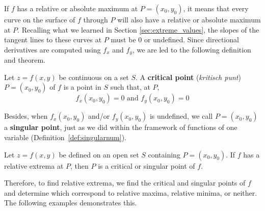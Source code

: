 If $f$ has a relative or absolute maximum at $P=(x_0,y_0)$, it means that every curve on the surface of $f$ through $P$ will also have a relative or absolute maximum at $P$. Recalling what we learned in Section \ref{sec:extreme_values}, the slopes of the tangent lines to these curves at $P$ must be 0 or undefined. Since directional derivatives are computed using $f_x$ and $f_y$, we are led to the following definition and theorem.

\begin{definition}\label{def:multi_critical_point}
Let $z = f(x,y)$ be continuous on a set $S$. A \textbf{critical point} (\textit{kritisch punt}) $P=(x_0,y_0)$ of $f$ is a point in $S$ such that, at $P$,
$$
f_x(x_0,y_0) = 0 \text{ and } f_y(x_0,y_0) = 0
$$
\end{definition}

Besides, when $f_x(x_0,y_0)$ and/or $f_y(x_0,y_0)$ is undefined, we call $P=(x_0,y_0)$ a \textbf{singular point}, just as we did within the framework of functions of one variable (Definition~\ref{def:singularnum}). 

\begin{theorem}\label{thm:multi_critical_point}
Let $z=f(x,y)$ be defined on an open set $S$ containing $P=(x_0,y_0)$. If $f$ has a relative extrema at $P$, then $P$ is a critical or singular point of $f$.
\end{theorem}

Therefore, to find relative extrema, we find the critical and singular points of $f$ and determine which correspond to relative maxima, relative minima, or neither. The following examples demonstrates this.

